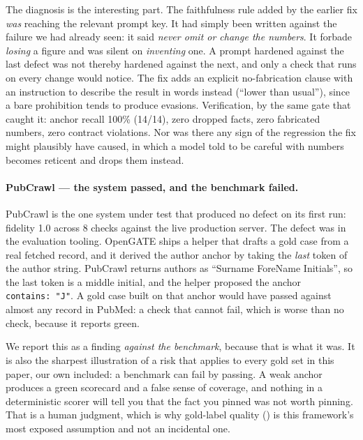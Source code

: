 \documentclass[11pt,a4paper]{article}
\begin{document}
The diagnosis is the interesting part. The faithfulness rule added by the earlier fix \emph{was}
reaching the relevant prompt key. It had simply been written against the failure we had already seen:
it said \emph{never omit or change the numbers}. It forbade \emph{losing} a figure and was silent on
\emph{inventing} one. A prompt hardened against the last defect was not thereby hardened against the
next, and only a check that runs on every change would notice. The fix adds an explicit
no-fabrication clause with an instruction to describe the result in words instead (``lower than
usual''), since a bare prohibition tends to produce evasions. Verification, by the same gate that
caught it: anchor recall 100\% (14/14), zero dropped facts, zero fabricated numbers, zero contract
violations. Nor was there any sign of the regression the fix might plausibly have caused, in which a
model told to be careful with numbers becomes reticent and drops them instead.

\paragraph{PubCrawl --- the system passed, and the benchmark failed.}
PubCrawl is the one system under test that produced no defect on its first run: fidelity 1.0
across 8 checks against the live production server. The defect was in the evaluation tooling. OpenGATE
ships a helper that drafts a gold case from a real fetched record, and it derived the author anchor by
taking the \emph{last} token of the author string. PubCrawl returns authors as ``Surname ForeName
Initials'', so the last token is a middle initial, and the helper proposed the anchor
\texttt{contains:\,"J"}. A gold case built on that anchor would have passed against almost any record
in PubMed: a check that cannot fail, which is worse than no check, because it reports green.

We report this as a finding \emph{against the benchmark}, because that is what it was. It is also the
sharpest illustration of a risk that applies to every gold set in this paper, our own included: a
benchmark can fail by passing. A weak anchor produces a green scorecard and a false sense of coverage, and nothing
in a deterministic scorer will tell you that the fact you pinned was not worth pinning. That is a
human judgment, which is why gold-label quality () is this framework's most exposed
assumption and not an incidental one.
\end{document}
